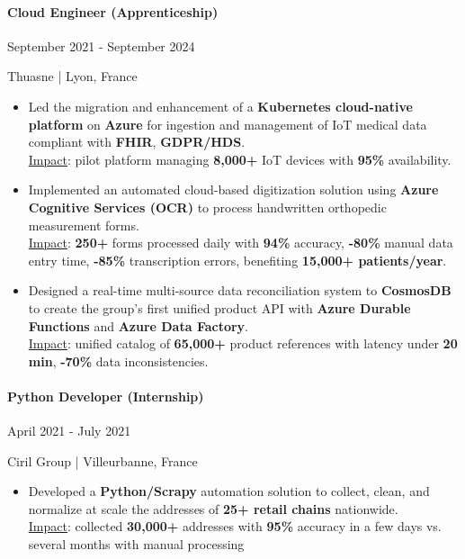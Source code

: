 \documentclass{article}
\begin{document}
\paragraph{Cloud Engineer (Apprenticeship)}\hspace*{\fill}September 2021 - September 2024

\noindent
Thuasne | Lyon, France

\raggedright  
\begin{itemize}
    \item{Led the migration and enhancement of a \textbf{Kubernetes cloud-native platform} on \textbf{Azure} for ingestion and management of IoT medical data compliant with \textbf{FHIR}, \textbf{GDPR/HDS}. \\ \underline{Impact}: pilot platform managing \textbf{8,000+} IoT devices with \textbf{95\%} availability.}
    \item{Implemented an automated cloud-based digitization solution using \textbf{Azure Cognitive Services (OCR)} to process handwritten orthopedic measurement forms.\\ \underline{Impact}: \textbf{250+} forms processed daily with \textbf{94\%} accuracy, \textbf{-80\%} manual data entry time, \textbf{-85\%} transcription errors, benefiting \textbf{15,000+ patients/year}.}
    \item{Designed a real-time multi-source data reconciliation system to \textbf{CosmosDB} to create the group's first unified product API with \textbf{Azure Durable Functions} and \textbf{Azure Data Factory}.\\ \underline{Impact}: unified catalog of \textbf{65,000+} product references with latency under \textbf{20 min}, \textbf{-70\%} data inconsistencies.}
\end{itemize}
\paragraph{Python Developer (Internship)}\hspace*{\fill}April 2021 - July 2021

\noindent
Ciril Group | Villeurbanne, France

\raggedright  
\begin{itemize}
    \item{Developed a \textbf{Python/Scrapy} automation solution to collect, clean, and normalize at scale the addresses of \textbf{25+ retail chains} nationwide.\\ \underline{Impact}: collected \textbf{30,000+} addresses with \textbf{95\%} accuracy in a few days vs. several months with manual processing}
\end{itemize}
\end{document}
